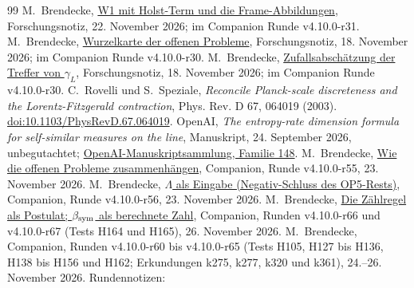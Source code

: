 \documentclass[11pt,a4paper]{article}
\begin{document}
\begin{thebibliography}{99}
M.~Brendecke, \href{https://github.com/Moriarty1982/QuantumSphere-Unfold/blob/d2020d178a483d1baa7be3871ca2e9d597992059/notes/research/w1_holst_frame_maps_2026_11_22/README.md}{W1 mit Holst-Term und die Frame-Abbildungen}, Forschungsnotiz, 22. November 2026; im Companion Runde v4.10.0-r31.
M.~Brendecke, \href{https://github.com/Moriarty1982/QuantumSphere-Unfold/blob/d2020d178a483d1baa7be3871ca2e9d597992059/notes/research/op_root_map_2026_11_18/README.md}{Wurzelkarte der offenen Probleme}, Forschungsnotiz, 18. November 2026; im Companion Runde v4.10.0-r30.
M.~Brendecke, \href{https://github.com/Moriarty1982/QuantumSphere-Unfold/blob/d2020d178a483d1baa7be3871ca2e9d597992059/notes/research/chance_estimate_2026_11_18/README.md}{Zufallsabschätzung der Treffer von \(\gamma_L\)}, Forschungsnotiz, 18. November 2026; im Companion Runde v4.10.0-r30.
C.~Rovelli und S.~Speziale, \emph{Reconcile Planck-scale discreteness and the Lorentz-Fitzgerald contraction}, Phys. Rev. D 67, 064019 (2003).
\href{https://doi.org/10.1103/PhysRevD.67.064019}{doi:10.1103/PhysRevD.67.064019}.
OpenAI, \emph{The entropy-rate dimension formula for self-similar measures on the line}, Manuskript, 24. September 2026, unbegutachtet;
\href{https://github.com/openai/math/tree/4eaee87548250b2682affda7d05d947c05554bae/preprints/The-entropy-rate-dimension-formula-for-self-similar-measures-on-the-line-September-24-2026}{OpenAI-Manuskriptsammlung, Familie 148}.
M.~Brendecke, \href{https://github.com/Moriarty1982/QuantumSphere-Unfold/blob/d2020d178a483d1baa7be3871ca2e9d597992059/notes/research/v4_10_0_r55/README.md}{Wie die offenen Probleme zusammenhängen}, Companion, Runde v4.10.0-r55, 23. November 2026.
M.~Brendecke, \href{https://github.com/Moriarty1982/QuantumSphere-Unfold/blob/1f7318f54a718cfe889a0902d40144ce2b70974a/notes/research/v4_10_0_r56/README.md}{\(\Lambda\) als Eingabe (Negativ-Schluss des OP5-Rests)}, Companion, Runde v4.10.0-r56, 23. November 2026.
M.~Brendecke, \href{https://github.com/Moriarty1982/QuantumSphere-Unfold/blob/3fc66afdf52467e3a2ef10cfdfe13353892cc081/notes/research/v4_10_0_r67_zaehlpostulat/README.md}{Die Zählregel als Postulat; \(\beta_{\rm sym}\) als berechnete Zahl}, Companion, Runden v4.10.0-r66 und v4.10.0-r67 (Tests H164 und H165), 26. November 2026.
M.~Brendecke, Companion, Runden v4.10.0-r60 bis v4.10.0-r65 (Tests H105, H127 bis H136, H138 bis H156 und H162; Erkundungen k275, k277,
k320 und k361), 24.--26. November 2026. Rundennotizen:

\end{thebibliography}
\end{document}
